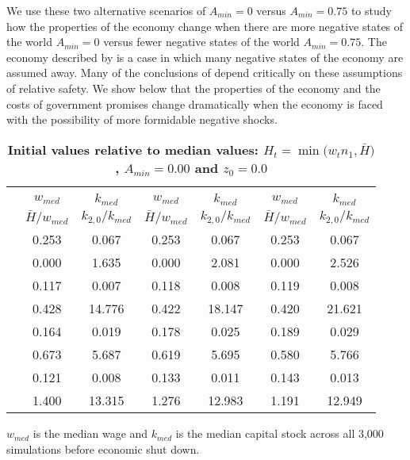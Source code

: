 \documentclass[letterpaper,12pt]{article}
\theoremstyle{definition}
\begin{document}
\begin{spacing}{1.5}
  We use these two alternative scenarios of $A_{min}=0$ versus $A_{min}=0.75$ to study how the properties of the economy change when there are more negative states of the world $A_{min}=0$ versus fewer negative states of the world $A_{min}=0.75$. The economy described by \citet{Blanchard:2019} is a case in which many negative states of the economy are assumed away. Many of the conclusions of \citet{Blanchard:2019} depend critically on these assumptions of relative safety. We show below that the properties of the economy and the costs of government promises change dramatically when the economy is faced with the possibility of more formidable negative shocks.


  \begin{table}[htbp]\centering\captionsetup{width=5.3in}
  \caption{\label{TabInitVal_A0}\textbf{Initial values relative to median values: $H_t = \min\bigl(w_t n_1, \bar{H}\bigr)$, $A_{min}=0.00$ and $z_0=0.0$}}
    \begin{threeparttable}
    \begin{tabular}{>{\small}c| >{\small}c >{\small}c| >{\small}c >{\small}c| >{\small}c >{\small}c}
      \hline\hline
      & \multicolumn{2}{c}{$k_{2,0}=0.11$} & \multicolumn{2}{c}{$k_{2,0}=0.14$} & \multicolumn{2}{c}{$k_{2,0}=0.17$} \\ \cline{2-7}
      & $w_{med}$ & $k_{med}$ & $w_{med}$ & $k_{med}$ & $w_{med}$ & $k_{med}$ \\
      & $\bar{H}/w_{med}$ & $k_{2,0}/k_{med}$ & $\bar{H}/w_{med}$ & $k_{2,0}/k_{med}$ & $\bar{H}/w_{med}$ & $k_{2,0}/k_{med}$ \\
      \hline
      \multirow{2}{*}{$\bar{H}=0.00$}
      & 0.253 & 0.067 & 0.253 & 0.067 & 0.253 & 0.067 \\
      & 0.000 & 1.635 & 0.000 & 2.081 & 0.000 & 2.526 \\
      \hline
      \multirow{2}{*}{$\bar{H}=0.05$}
      & 0.117 & 0.007 & 0.118 & 0.008 & 0.119 & 0.008 \\
      & 0.428 & 14.776 & 0.422 & 18.147 & 0.420 & 21.621 \\
      \hline
      \multirow{2}{*}{$\bar{H}=0.11$}
      & 0.164 & 0.019 & 0.178 & 0.025 & 0.189 & 0.029 \\
      & 0.673 & 5.687 & 0.619 & 5.695 & 0.580 & 5.766 \\
      \hline
      \multirow{2}{*}{$\bar{H}=0.17$}
      & 0.121 & 0.008 & 0.133 & 0.011 & 0.143 & 0.013 \\
      & 1.400 & 13.315 & 1.276 & 12.983 & 1.191 & 12.949 \\
      \hline\hline
    \end{tabular}
    \begin{tablenotes}
      \scriptsize{\item[]$w_{med}$ is the median wage and $k_{med}$ is the median capital stock across all 3,000 simulations before economic shut down.}
    \end{tablenotes}
    \end{threeparttable}
  \end{table}


\end{spacing}
\end{document}
